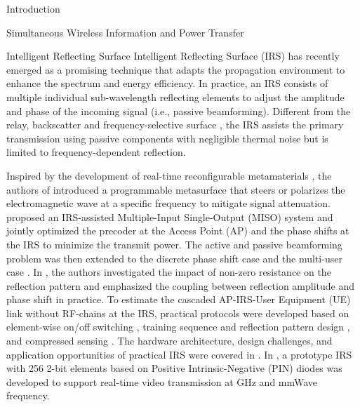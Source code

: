 \documentclass[journal]{IEEEtran}
\begin{document}
\begin{section}{Introduction}
\begin{subsection}{Simultaneous Wireless Information and Power Transfer}
		\end{subsection}


		\begin{subsection}{Intelligent Reflecting Surface}
			Intelligent Reflecting Surface (IRS) has recently emerged as a promising technique that adapts the propagation environment to enhance the spectrum and energy efficiency. In practice, an IRS consists of multiple individual sub-wavelength reflecting elements to adjust the amplitude and phase of the incoming signal (i.e., passive beamforming). Different from the relay, backscatter and frequency-selective surface \cite{Anwar2018}, the IRS assists the primary transmission using passive components with negligible thermal noise but is limited to frequency-dependent reflection.

			Inspired by the development of real-time reconfigurable metamaterials \cite{Cui2014}, the authors of \cite{Liaskos2018} introduced a programmable metasurface that steers or polarizes the electromagnetic wave at a specific frequency to mitigate signal attenuation. \cite{Wu2018} proposed an IRS-assisted Multiple-Input Single-Output (MISO) system and jointly optimized the precoder at the Access Point (AP) and the phase shifts at the IRS to minimize the transmit power. The active and passive beamforming problem was then extended to the discrete phase shift case \cite{Wu2019a} and the multi-user case \cite{Wu2019}. In \cite{Abeywickrama2020}, the authors investigated the impact of non-zero resistance on the reflection pattern and emphasized the coupling between reflection amplitude and phase shift in practice. To estimate the cascaded AP-IRS-User Equipment (UE) link without RF-chains at the IRS, practical protocols were developed based on element-wise on/off switching \cite{Nadeem2019}, training sequence and reflection pattern design \cite{You2019,Kang2020}, and compressed sensing \cite{Wang2020}. The hardware architecture, design challenges, and application opportunities of practical IRS were covered in \cite{Wu2020}. In \cite{Dai2020}, a prototype IRS with \num{256} \num{2}-bit elements based on Positive Intrinsic-Negative (PIN) diodes was developed to support real-time video transmission at \si{GHz} and mmWave frequency.
		\end{subsection}



\end{section}
\end{document}
